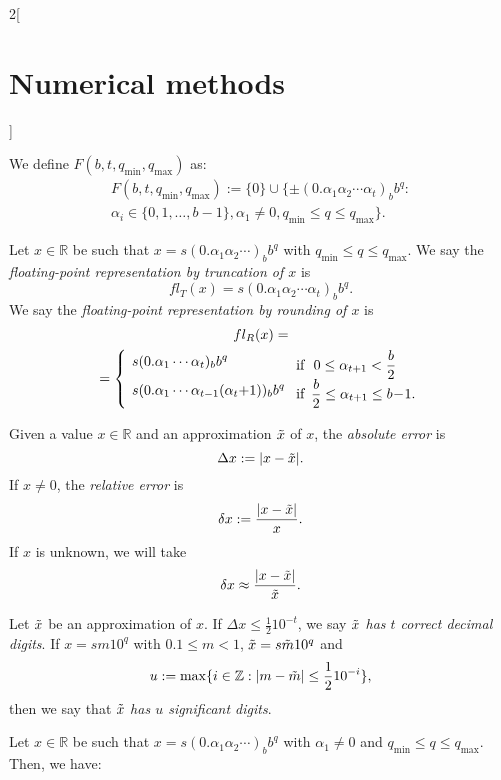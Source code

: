 \documentclass[class=article,10pt,crop=false]{standalone}
\begin{document}
\begin{multicols}{2}[\section{Numerical methods}]
\begin{table}[ht]
\end{table}
\begin{definition}
We define $F(b,t,q_\text{min},q_\text{max})$ as:
\begin{multline*}
    F(b,t,q_\text{min},q_\text{max}):=\{0\}\cup\{\pm(0.\alpha_1\alpha_2\cdots\alpha_t)_bb^q:\\\alpha_i\in\{0,1,\ldots,b-1\},\alpha_1\ne0, q_\text{min}\leq q\leq q_\text{max}\}.
\end{multline*}
\end{definition}
\begin{definition}
Let $x\in\mathbb{R}$ be such that $x=s(0.\alpha_1\alpha_2\cdots)_bb^q$ with $q_\text{min}\leq q\leq q_\text{max}$. We say the \textit{floating-point representation by truncation of $x$} is $$fl_T(x)=s(0.\alpha_1\alpha_2\cdots\alpha_t)_bb^q.$$ We say the \textit{floating-point representation by rounding of $x$} is
\begin{multline*}
fl_R(x)=\\=\left\{\text{\setlength{\tabcolsep}{4pt}\begin{tabular}{m{3.85cm}m{3cm}}
        $s(0.\alpha_1\cdots\alpha_t)_bb^q$ & if $\ 0\leq\alpha_{t+1}<\frac{b}{2}$\\
        $s(0.\alpha_1\cdots\alpha_{t-1}(\alpha_t+1))_bb^q$ & if $\ \frac{b}{2}\leq\alpha_{t+1}\leq b-1.$
    \end{tabular}}\right.
\end{multline*}
\end{definition}
\begin{definition}
Given a value $x\in\mathbb{R}$ and an approximation $\Tilde{x}$ of $x$, the \textit{absolute error} is $$\Delta x:=|x-\Tilde{x}|.$$ If $x\ne 0$, the \textit{relative error} is $$\delta x:=\frac{|x-\Tilde{x}|}{x}.$$ If $x$ is unknown, we will take $$\delta x\approx\frac{|x-\Tilde{x}|}{\Tilde{x}}.$$
\end{definition}
\begin{definition}
Let $\Tilde{x}$ be an approximation of $x$. If $\Delta x\leq\frac{1}{2}10^{-t}$, we say \textit{$\Tilde{x}$ has $t$ correct decimal digits}. If $x=sm10^q$ with $0.1\leq m<1$, $\Tilde{x}=s\Tilde{m}10^q$ and $$u:=\max\{i\in\mathbb{Z}:|m-\Tilde{m}|\leq\frac{1}{2}10^{-i}\},$$ then we say that $\Tilde{x}$ \textit{has $u$ significant digits}.
\end{definition}
\begin{prop}
Let $x\in\mathbb{R}$ be such that $x=s(0.\alpha_1\alpha_2\cdots)_bb^q$ with $\alpha_1\ne0$ and $q_\text{min}\leq q\leq q_\text{max}$. Then, we have:

\end{prop}
\end{multicols}
\end{document}
